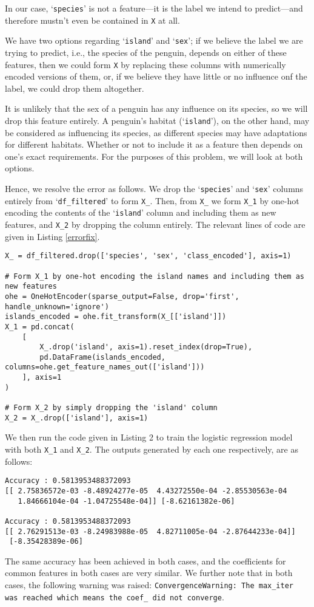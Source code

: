 \documentclass{article}[a4paper]
\begin{document}
	In our case, `\texttt{species}' is not a feature---it is the label we intend to predict---and therefore mustn't even be contained in \texttt{X} at all.
	
	We have two options regarding `\texttt{island}' and `\texttt{sex}'; if we  believe the label we are trying to predict, i.e., the species of the penguin, depends on either of these features, then we could form \texttt{X} by replacing these columns with numerically encoded versions of them, or, if we believe they have little or no influence onf the label, we could drop them altogether.

	It is unlikely that the sex of a penguin has any influence on its species, so we will drop this feature entirely. A penguin's habitat (`\texttt{island}'), on the other hand, may be considered as influencing its species, as different species may have adaptations for different habitats. Whether or not to include it as a feature then depends on one's exact requirements. For the purposes of this problem, we will look at both options.
	
	Hence, we resolve the error as follows. We drop the `\texttt{species}' and `\texttt{sex}' columns entirely from `\texttt{df\_filtered}' to form \texttt{X\_}. Then, from \texttt{X\_} we form \texttt{X\_1} by one-hot encoding the contents of the `\texttt{island}' column and including them as new features, and \texttt{X\_2} by dropping the column entirely. The relevant lines of code are given in Listing \ref{errorfix}.

	\begin{lstlisting}[caption={Fix for the error}, label=errorfix]
X_ = df_filtered.drop(['species', 'sex', 'class_encoded'], axis=1)

# Form X_1 by one-hot encoding the island names and including them as new features
ohe = OneHotEncoder(sparse_output=False, drop='first', handle_unknown='ignore')
islands_encoded = ohe.fit_transform(X_[['island']])
X_1 = pd.concat(
    [
        X_.drop('island', axis=1).reset_index(drop=True),
        pd.DataFrame(islands_encoded, columns=ohe.get_feature_names_out(['island']))
    ], axis=1
)

# Form X_2 by simply dropping the 'island' column
X_2 = X_.drop(['island'], axis=1)
	\end{lstlisting}

	We then run the code given in Listing 2 to train the logistic regression model with both \texttt{X\_1} and \texttt{X\_2}. The outputs generated by each one respectively, are as follows:
	\begin{verbatim}
Accuracy : 0.5813953488372093
[[ 2.75836572e-03 -8.48924277e-05  4.43272550e-04 -2.85530563e-04
   1.84666104e-04 -1.04725548e-04]] [-8.62161382e-06]

Accuracy : 0.5813953488372093
[[ 2.76291513e-03 -8.24983988e-05  4.82711005e-04 -2.87644233e-04]]
 [-8.35428389e-06]
\end{verbatim}
	The same accuracy has been achieved in both cases, and the coefficients for common features in both cases are very similar. We further note that in both cases, the following warning was raised: \texttt{ConvergenceWarning: The max\_iter was reached which means the coef\_ did not converge}.
	\medskip
\end{document}
